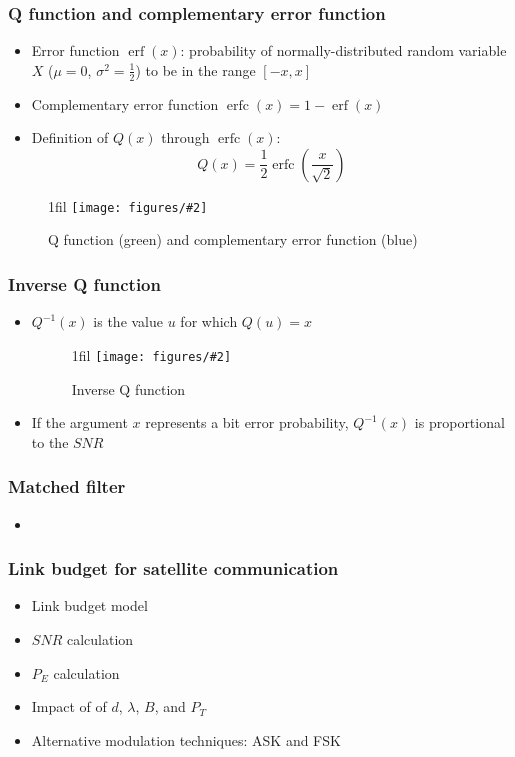 \documentclass{beamer}
\makeatletter
\newcommand*{\centerfloat}{%
  \parindent \z@
  \leftskip \z@ \@plus 1fil \@minus \textwidth
  \rightskip\leftskip
  \parfillskip \z@skip}
\newcommand{\fig}[3]{
  \begin{figure}[H]
  \centerfloat
    \texttt{[image: figures/\#2]}
	\caption{#3}
  \end{figure}
}
\makeatother
\begin{document}
\begin{frame}
	\frametitle{Q function and complementary error function}
	\begin{itemize}
		\item Error function $\operatorname{erf}(x)$: probability of normally-distributed random variable $X$ ($\mu = 0$, $\sigma^2 = \frac{1}{2}$) to be in the range $[-x, x]$
		\item Complementary error function $\operatorname{erfc}(x) = 1 - \operatorname{erf}(x)$
		\item Definition of $Q(x)$ through $\operatorname{erfc}(x)$:
		\begin{equation}
			Q(x) = \frac{1}{2}\operatorname{erfc} \left(\frac{x}{\sqrt{2}} \right)
		\end{equation}
	\end{itemize}
	\fig{2cm}{q3.png}{Q function (green) and complementary error function (blue)}
\end{frame}

\begin{frame}
	\frametitle{Inverse Q function}
	\begin{itemize}
		\item $Q^{-1}(x)$ is the value $u$ for which $Q(u) = x$
		\fig{2cm}{q2.png}{Inverse Q function}
		\item If the argument $x$ represents a bit error probability, $Q^{-1}(x)$ is proportional to the $SNR$
	\end{itemize}
\end{frame}


\begin{frame}
	\frametitle{Matched filter}
	\begin{itemize}
		\item
	\end{itemize}
\end{frame}


\begin{frame}
	\frametitle{Link budget for satellite communication}
	\begin{itemize}
		\item Link budget model
		\item $SNR$ calculation
		\item $P_E$ calculation
		\item Impact of of $d$, $\lambda$, $B$, and $P_T$
		\item Alternative modulation techniques: ASK and FSK
	\end{itemize}
\end{frame}
\end{document}
